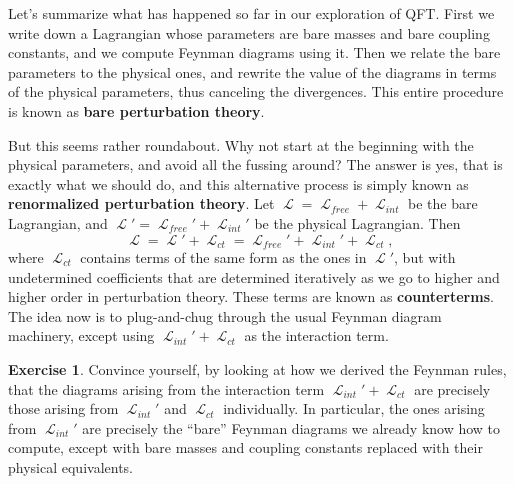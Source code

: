 \documentclass{report}
\theoremstyle{plain}
\theoremstyle{definition}
\newtheorem{exercise}{Exercise}[section]
\theoremstyle{remark}
\DeclareMathOperator{\cL}{\mathcal{L}}
\begin{document}
Let's summarize what has happened so far in our exploration of QFT.
First we write down a Lagrangian whose parameters are bare masses and
bare coupling constants, and we compute Feynman diagrams using it.
Then we relate the bare parameters to the physical ones, and rewrite
the value of the diagrams in terms of the physical parameters, thus
canceling the divergences. This entire procedure is known as {\bf bare
  perturbation theory}.

But this seems rather roundabout. Why not start at the beginning with
the physical parameters, and avoid all the fussing around? The answer
is yes, that is exactly what we should do, and this alternative
process is simply known as {\bf renormalized perturbation theory}. Let
$\cL = \cL_{free} + \cL_{int}$ be the bare Lagrangian, and
$\cL' = \cL_{free}' + \cL_{int}'$ be the physical Lagrangian. Then
$$ \cL = \cL' + \cL_{ct} = \cL_{free}' + \cL_{int}' + \cL_{ct}, $$
where $\cL_{ct}$ contains terms of the same form as the ones in
$\cL'$, but with undetermined coefficients that are determined
iteratively as we go to higher and higher order in perturbation
theory. These terms are known as {\bf counterterms}. The idea now is
to plug-and-chug through the usual Feynman diagram machinery, except
using $\cL_{int}' + \cL_{ct}$ as the interaction term.

\begin{exercise}
  Convince yourself, by looking at how we derived the Feynman rules,
  that the diagrams arising from the interaction term
  $\cL_{int}' + \cL_{ct}$ are precisely those arising from
  $\cL_{int}'$ and $\cL_{ct}$ individually. In particular, the ones
  arising from $\cL_{int}'$ are precisely the ``bare'' Feynman
  diagrams we already know how to compute, except with bare masses and
  coupling constants replaced with their physical equivalents. 
\end{exercise}
\end{document}
